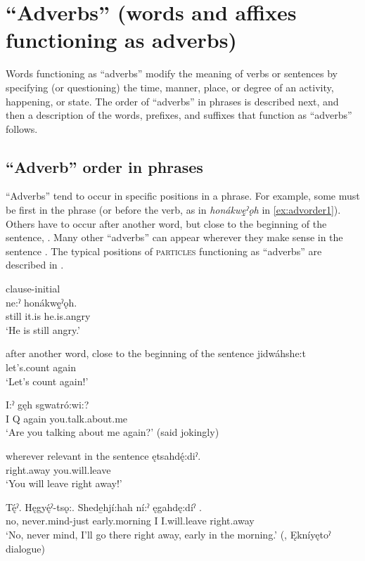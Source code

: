 \chapter{“Adverbs” (words and affixes functioning as adverbs)} \label{ch:’Adverbs’ (words and affixes that function as adverbs)}
Words functioning as “adverbs” modify the meaning of verbs or sentences by specifying (or questioning) the time, manner, place, or degree of an activity, happening, or state. The order of “adverbs” in phrases is described next, and then a description of the words, prefixes, and suffixes that function as “adverbs” follows.


\section{“Adverb” order in phrases} \label{ch:’Adverb’ order in phrases}
“Adverbs” tend to occur in specific positions in a phrase. For example, some must be first in the phrase (or before the verb, as in \textit{honákwę̱ˀǫh} in \ref{ex:advorder1}). Others have to occur after another word, but close to the beginning of the sentence, . Many other “adverbs” can appear wherever they make sense in the sentence . The typical positions of \textsc{particles} functioning as “adverbs” are described in .

\ea\label{ex:advorder1} clause-initial\\
 \gll {} ne:ˀ honákwę̱ˀǫh. \\
still it.is he.is.angry\\
\glt ‘He is still angry.’
\z

\ea\label{ex:advorder2} after another word, close to the beginning of the sentence
\ea
 \gll jidwáhshe:t  \\
let’s.count again\\
\glt ‘Let’s count again!’

\ex
 \gll I:ˀ gęh  sgwatró:wi:? \\
I Q again you.talk.about.me\\
\glt ‘Are you talking about me again?’ (said jokingly)
\z
\z

\ea\label{ex:advorder3} wherever relevant in the sentence
\ea
 \gll {} ętsahdę́:diˀ. \\
right.away you.will.leave\\
\glt ‘You will leave right away!’

\ex
 \gll Tę́ˀ. Hęgyę́ˀ-tsǫ:. Shede̱hjí:hah ní:ˀ ęgahdę:díˀ .\\
no, never.mind-just early.morning I I.will.leave right.away\\
\glt ‘No, never mind, I’ll go there right away, early in the morning.’ (\cite[494]{mithun_watewayestanih_1984}, Ękníyętoˀ dialogue)
\z 
\z



